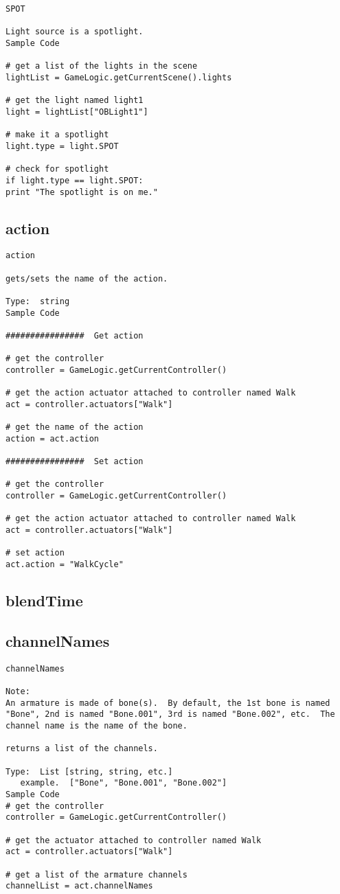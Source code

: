 \begin{verbatim}
SPOT

Light source is a spotlight.
Sample Code

# get a list of the lights in the scene
lightList = GameLogic.getCurrentScene().lights

# get the light named light1
light = lightList["OBLight1"]

# make it a spotlight
light.type = light.SPOT

# check for spotlight
if light.type == light.SPOT:
print "The spotlight is on me."
\end{verbatim}

\subsection{action}
\begin{verbatim}
action

gets/sets the name of the action.

Type:  string
Sample Code

################  Get action

# get the controller
controller = GameLogic.getCurrentController()

# get the action actuator attached to controller named Walk
act = controller.actuators["Walk"]

# get the name of the action
action = act.action

################  Set action

# get the controller
controller = GameLogic.getCurrentController()

# get the action actuator attached to controller named Walk
act = controller.actuators["Walk"] 

# set action
act.action = "WalkCycle"
\end{verbatim}
\subsection{blendTime}
\subsection{channelNames}
\begin{verbatim}
channelNames

Note:
An armature is made of bone(s).  By default, the 1st bone is named "Bone", 2nd is named "Bone.001", 3rd is named "Bone.002", etc.  The channel name is the name of the bone.

returns a list of the channels.  

Type:  List [string, string, etc.]
   example.  ["Bone", "Bone.001", "Bone.002"]
Sample Code
# get the controller
controller = GameLogic.getCurrentController()

# get the actuator attached to controller named Walk
act = controller.actuators["Walk"]

# get a list of the armature channels
channelList = act.channelNames
\end{verbatim}


